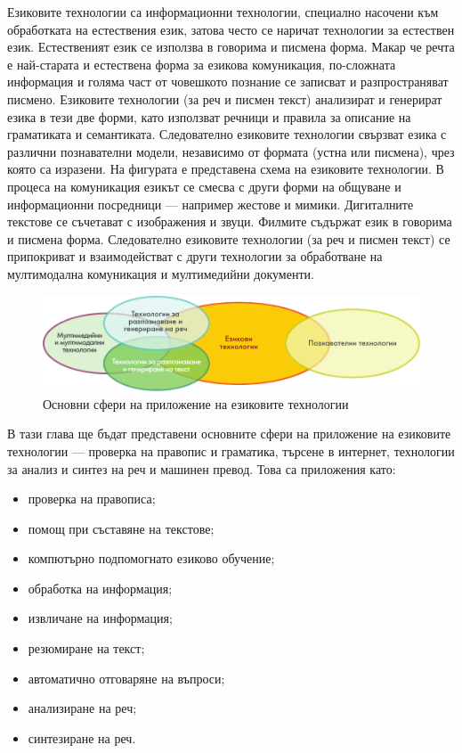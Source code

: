 \documentclass[]{../../metanetpaper}
\begin{document}
\begin{multicols}{2}

Езиковите технологии са информационни технологии, специално насочени към обработката на естествения език, затова често се наричат технологии за естествен език. Естественият език се използва в говорима и писмена форма. Макар че речта е най-старата и естествена форма за езикова комуникация, по-сложната информация и голяма част от човешкото познание се записват и разпространяват писмено. Езиковите технологии (за реч и писмен текст) анализират и генерират езика в тези две форми, като използват речници и правила за описание на граматиката и семантиката. Следователно езиковите технологии свързват езика с различни познавателни модели, независимо от формата (устна или писмена), чрез която са изразени.
На фигурата е представена схема на езиковите технологии. В процеса на комуникация езикът се смесва с други форми на общуване и информационни посредници — например жестове и мимики. Дигиталните текстове се съчетават с изображения и звуци. Филмите съдържат език в говорима и писмена форма. Следователно езиковите технологии (за реч и писмен текст) се припокриват и взаимодействат с други технологии за  обработване на мултимодална комуникация и мултимедийни документи. 

\begin{figure}[htb]
  \center
  \includegraphics[width=\textwidth]{../_media/bulgarian/language_technologies}
  \caption{Основни сфери на приложение на езиковите технологии}
  \label{fig:ltincontext_de}
\end{figure}

В тази глава  ще бъдат представени основните сфери на приложение на
езиковите технологии — проверка на правопис и граматика, търсене в
интернет, технологии за анализ и синтез на реч и машинен превод. Това
са приложения като: 

\begin{itemize}
\item проверка на правописа;
\item помощ при съставяне на текстове;
\item компютърно подпомогнато езиково обучение;
\item обработка на информация;
\item извличане на информация;
\item резюмиране на текст;
\item автоматично отговаряне на въпроси;
\item анализиране на реч;
\item синтезиране на реч.
\end{itemize}


\end{multicols}
\end{document}
